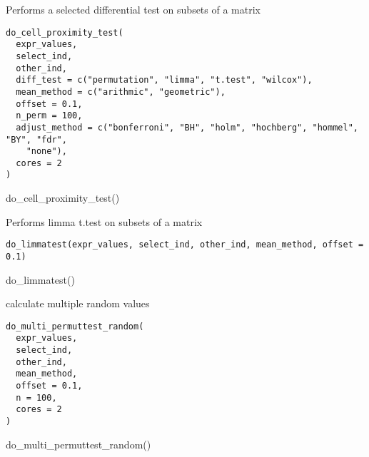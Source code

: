 \documentclass[a4paper]{book}
\begin{document}
\begin{Description}\relax
Performs a selected differential test on subsets of a matrix
\end{Description}
%
\begin{Usage}
\begin{verbatim}
do_cell_proximity_test(
  expr_values,
  select_ind,
  other_ind,
  diff_test = c("permutation", "limma", "t.test", "wilcox"),
  mean_method = c("arithmic", "geometric"),
  offset = 0.1,
  n_perm = 100,
  adjust_method = c("bonferroni", "BH", "holm", "hochberg", "hommel", "BY", "fdr",
    "none"),
  cores = 2
)
\end{verbatim}
\end{Usage}
%
\begin{Examples}
\begin{ExampleCode}
    do_cell_proximity_test()
\end{ExampleCode}
\end{Examples}
%
\begin{Description}\relax
Performs limma t.test on subsets of a matrix
\end{Description}
%
\begin{Usage}
\begin{verbatim}
do_limmatest(expr_values, select_ind, other_ind, mean_method, offset = 0.1)
\end{verbatim}
\end{Usage}
%
\begin{Examples}
\begin{ExampleCode}
    do_limmatest()
\end{ExampleCode}
\end{Examples}
%
\begin{Description}\relax
calculate multiple random values
\end{Description}
%
\begin{Usage}
\begin{verbatim}
do_multi_permuttest_random(
  expr_values,
  select_ind,
  other_ind,
  mean_method,
  offset = 0.1,
  n = 100,
  cores = 2
)
\end{verbatim}
\end{Usage}
%
\begin{Examples}
\begin{ExampleCode}
    do_multi_permuttest_random()
\end{ExampleCode}
\end{Examples}
\end{document}
